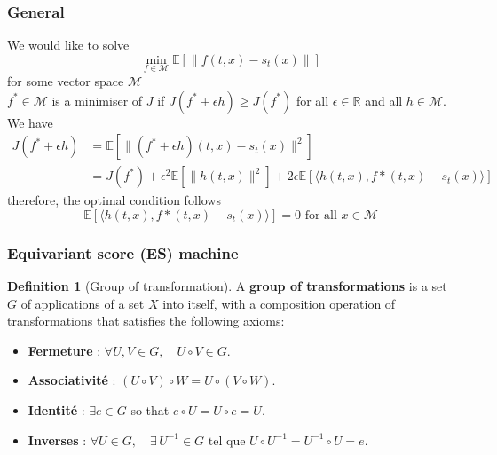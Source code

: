 \documentclass[a4paper,10pt]{article}
\theoremstyle{definition} %
\newtheorem{definition}{Definition}[section]
\theoremstyle{definition} %
\theoremstyle{definition} %
\theoremstyle{definition} %
\newcommand{\R}{\mathbb{R}}
\newcommand{\E}[1]{\mathbb{E} \left[ {#1} \right] }
\newcommand{\0}{\boldsymbol{0}}
\begin{document}
\subsubsection{General}
We would like to solve
\begin{equation*}
    \min_{f\in\mathcal{M}} \E{\| f(t,x)-s_t(x)\|}
\end{equation*}
for some vector space $\mathcal{M}$\\
$f^* \in \mathcal{M}$ is a minimiser of $J$ if $J(f^*+\epsilon h) \geq J(f^*)$ for all $\epsilon \in \R$ and all $h\in \mathcal{M}$. We have
\begin{align*}
    J(f^*+\epsilon h) &= \E{\|(f^*+\epsilon h)(t,x)-s_t(x)\|^2}\\
    & = J(f^*)+\epsilon^2\E{\|h(t,x)\|^2}+2\epsilon\E{\langle h(t,x),f*(t,x) - s_t(x) \rangle}
\end{align*}
therefore, the optimal condition follows
\begin{equation}\label{eq:optimal_condition_score_function}
    \E{\langle h(t,x),f*(t,x) - s_t(x) \rangle} = 0 \text{ for all } x \in \mathcal{M}
\end{equation}

\subsubsection{Equivariant score (ES) machine}
\begin{definition}[Group of transformation]
    A \textbf{group of transformations} is a set \( G \) of applications of a set \( X \) into itself, with a composition operation of transformations that satisfies the following axioms:
    \begin{itemize}[topsep=-5pt]
    \item[] \textbf{Fermeture} : \( \forall U, V \in G, \quad U \circ V \in G \).
    \item[] \textbf{Associativité} : \( (U \circ V) \circ W = U \circ (V \circ W) \).
    \item[] \textbf{Identité} : \( \exists e \in G \) so that \( e \circ U = U \circ e = U \).
    \item[] \textbf{Inverses} : \( \forall U \in G, \quad \exists \,U^{-1} \in G \text{ tel que } U \circ U^{-1} = U^{-1} \circ U = e \).
\end{itemize}
\end{definition}



\end{document}
